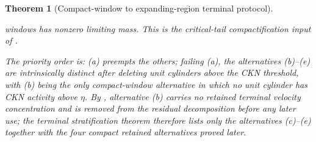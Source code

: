 \documentclass[11pt]{amsart}
\numberwithin{equation}{section}
\theoremstyle{plain}
\newtheorem{theorem}{Theorem}[section]
\theoremstyle{definition}
\theoremstyle{remark}
\begin{document}
\begin{theorem}[Compact-window to expanding-region terminal protocol]
\begin{enumerate}[label=\textup{(\alph*)}]
   windows has nonzero limiting mass.  This is the critical-tail compactification
   input of .
\end{enumerate}
The priority order is: \textup{(a)} preempts the others; failing
\textup{(a)}, the alternatives \textup{(b)}--\textup{(e)} are intrinsically
distinct after deleting unit cylinders above the CKN threshold, with
\textup{(b)} being the only
compact-window alternative in which no unit cylinder has CKN activity above
\(\eta\).  By , alternative
\textup{(b)} carries no retained terminal velocity concentration and is
removed from the residual decomposition before any later use; the terminal
stratification theorem
 therefore lists only the alternatives
\textup{(c)}--\textup{(e)} together with the four compact retained
alternatives proved later.
\end{theorem}
\end{document}
